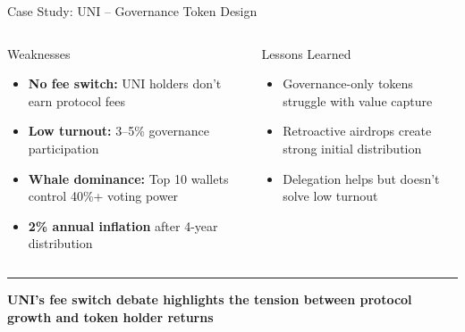 \documentclass[8pt,aspectratio=169]{beamer}
\newcommand{\bottomnote}[1]{\vfill\vspace{-2mm}\textcolor{mllavender2}{\rule{\textwidth}{0.4pt}}\vspace{1mm}\footnotesize\textbf{#1}}
\begin{document}
\begin{frame}{Case Study: UNI -- Governance Token Design}
\begin{columns}[T]
\begin{alertblock}{\footnotesize Weaknesses}
\footnotesize
\begin{itemize}
  \item \textbf{No fee switch:} UNI holders don't earn protocol fees
  \item \textbf{Low turnout:} 3--5\% governance participation
  \item \textbf{Whale dominance:} Top 10 wallets control 40\%+ voting power
  \item \textbf{2\% annual inflation} after 4-year distribution
\end{itemize}
\end{alertblock}
\vspace{2mm}
\begin{block}{Lessons Learned}
\footnotesize
\begin{itemize}
  \item Governance-only tokens struggle with value capture
  \item Retroactive airdrops create strong initial distribution
  \item Delegation helps but doesn't solve low turnout
\end{itemize}
\end{block}
\end{columns}
\bottomnote{UNI's fee switch debate highlights the tension between protocol growth and token holder returns}
\end{frame}
\end{document}
